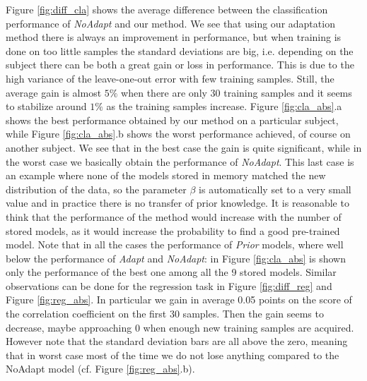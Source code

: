 Figure \ref{fig:diff_cla} shows the average difference between 
the classification performance of \emph{NoAdapt} and our method. We see that using our adaptation
method there is always an improvement in performance, but when training is done on too little samples %
the standard deviations are big, i.e. depending on the subject there can be both a great gain or loss in performance. 
This is due to the high variance of the
leave-one-out error with few training samples. Still, the average gain is
almost $5\%$ when there are only 30 training samples and it seems to stabilize
around $1\%$ as the training samples increase.
Figure \ref{fig:cla_abs}.a shows the best performance obtained by our method
on a particular subject, while  Figure \ref{fig:cla_abs}.b shows the worst
performance achieved, of course on another subject. We see that in the best case the gain is quite significant,
while in the worst case we basically obtain  the performance of \emph{NoAdapt}. This last case is an example
where none of the models stored in memory matched the new distribution of the data, so the parameter
$\beta$ is automatically set to a very small value and in practice there is no transfer of prior knowledge. It is reasonable to think
that the performance of the method would increase with the number of stored
models, as it would increase the probability to find a good pre-trained model.
Note that in all the cases the performance of \emph{Prior} models, where well
below the performance of \emph{Adapt} and \emph{NoAdapt}: in Figure \ref{fig:cla_abs} is shown
only the performance of the best one among all the 9 stored models.
Similar observations can be done for the regression task in Figure \ref{fig:diff_reg}
and Figure \ref{fig:reg_abs}. In particular we gain in average 0.05 points on the score
of the correlation coefficient on the first 30 samples. Then the gain seems to decrease,
maybe approaching 0 when enough new training samples are acquired. However note that
the standard deviation bars are all above the zero, meaning that in worst case most of the time
we do not lose anything compared to the NoAdapt model (cf. Figure \ref{fig:reg_abs}.b).


